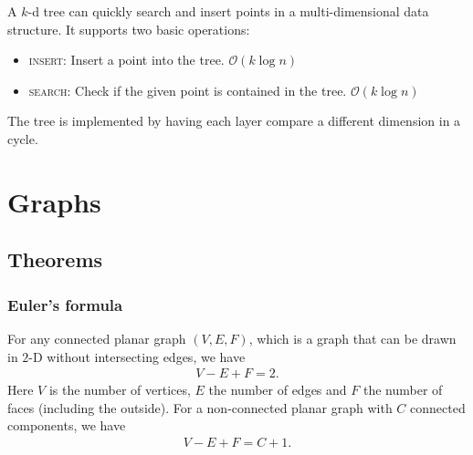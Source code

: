 A $k$-d tree can quickly search and insert points in a multi-dimensional data structure. It supports two basic operations:
\begin{itemize}
    \item \textsc{insert:} Insert a point into the tree. $\mathcal O(k\log n)$
    \item \textsc{search:} Check if the given point is contained in the tree. $\mathcal O(k\log n)$
\end{itemize}
The tree is implemented by having each layer compare a different dimension in a cycle.
\begin{figure}[H]
    \centering
\end{figure}
\vspace{-0.3cm}





\section{Graphs}

\subsection{Theorems}

\subsubsection{Euler's formula}
For any connected planar graph $(V, E, F)$, which is a graph that can be drawn in $2$-D without intersecting edges, we have
\begin{align*}
    V - E + F = 2.
\end{align*}
Here $V$ is the number of vertices, $E$ the number of edges and $F$ the number of faces (including the outside). For a non-connected planar graph with $C$ connected components, we have
\begin{align*}
    V - E + F = C + 1.
\end{align*}

